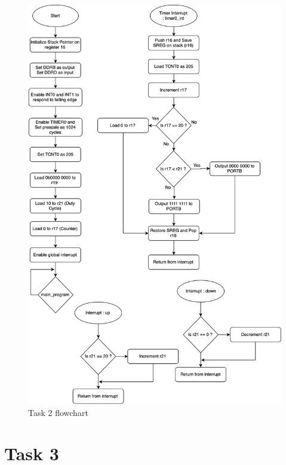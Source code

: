 \documentclass[a4paper,12pt]{article}
\begin{document}
\begin{figure}
\begin{center}
\includegraphics[width=\textwidth/1]{flowchart/task2_flowchart.png}
\end{center}
\caption{Task 2 flowchart}
\label{task2}
\end{figure}




\break
\section{Task 3}

\lstset{style=Asm}
\end{document}
